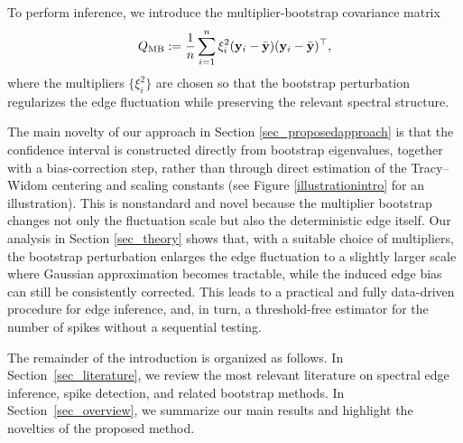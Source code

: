 \documentclass[12pt]{article}
\def\yb{\mathbf y}
\theoremstyle{plain}
\numberwithin{equation}{section}
\begin{document}
To perform inference, we introduce the multiplier-bootstrap covariance matrix
\vspace*{-10pt}
\begin{equation}
	\vspace*{-10pt}
	Q_{\mathrm{MB}}
	:=
	\frac1n\sum_{i=1}^n \xi_i^2(\yb_i-\bar{\yb})(\yb_i-\bar{\yb})^\top,
	\label{eq_boostrap}
\end{equation}
where the multipliers $\{\xi_i^2\}$ are chosen so that the bootstrap perturbation regularizes the edge fluctuation while preserving the relevant spectral structure.

The main novelty of our approach in Section \ref{sec_proposedapproach} is that the confidence interval is constructed directly from bootstrap eigenvalues, together with a bias-correction step, rather than through direct estimation of the Tracy--Widom centering and scaling constants (see Figure \ref{illustrationintro} for an illustration). This is nonstandard and novel because the multiplier bootstrap changes not only the fluctuation scale but also the deterministic edge itself. Our analysis in Section \ref{sec_theory} shows that, with a suitable choice of multipliers, the bootstrap perturbation enlarges the edge fluctuation to a slightly larger scale where Gaussian approximation becomes tractable, while the induced edge bias can still be consistently corrected. This leads to a practical and fully data-driven procedure for edge inference, and, in turn, a threshold-free estimator for the number of spikes without a sequential testing.




The remainder of the introduction is organized as follows. In Section~\ref{sec_literature}, we review the most relevant literature on spectral edge inference, spike detection, and related bootstrap methods. In Section~\ref{sec_overview}, we summarize our main results and highlight the novelties of the proposed method.
\end{document}
